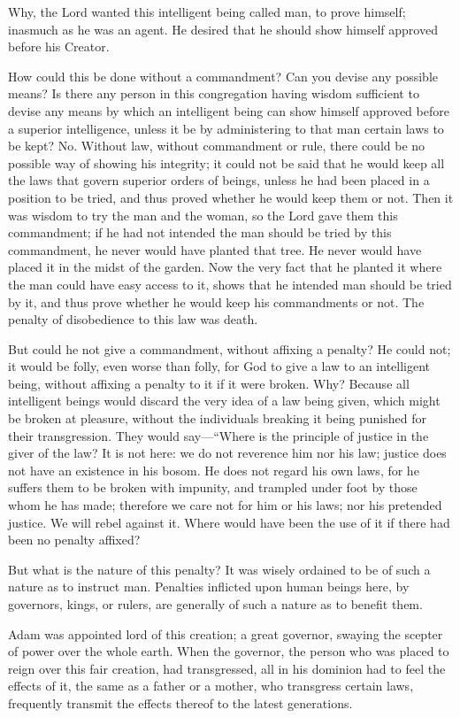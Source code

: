 Why, the Lord wanted this intelligent being called man, to prove himself; inasmuch as he
was an agent. He desired that he should show himself approved before his Creator.

How could this be done without a commandment? Can you devise any possible means? Is
there any person in this congregation having wisdom sufficient to devise any means by which
an intelligent being can show himself approved before a superior intelligence, unless it be by
administering to that man certain laws to be kept? No. Without law, without commandment
or rule, there could be no possible way of showing his integrity; it could not be said that he
would keep all the laws that govern superior orders of beings, unless he had been placed in a
position to be tried, and thus proved whether he would keep them or not. Then it was wisdom
to try the man and the woman, so the Lord gave them this commandment; if he had not
intended the man should be tried by this commandment, he never would have planted that
tree. He never would have placed it in the midst of the garden. Now the very fact that he
planted it where the man could have easy access to it, shows that he intended man should be
tried by it, and thus prove whether he would keep his commandments or not. The penalty of
disobedience to this law was death.

But could he not give a commandment, without affixing a penalty? He could not; it would be
folly, even worse than folly, for God to give a law to an intelligent being, without affixing a
penalty to it if it were broken. Why? Because all intelligent beings would discard the very
idea of a law being given, which might be broken at pleasure, without the individuals
breaking it being punished for their transgression. They would say—``Where is the principle
of justice in the giver of the law? It is not here: we do not reverence him nor his law; justice
does not have an existence in his bosom. He does not regard his own laws, for he suffers
them to be broken with impunity, and trampled under foot by those whom he has made;
therefore we care not for him or his laws; nor his pretended justice. We will rebel against it.
Where would have been the use of it if there had been no penalty affixed?

But what is the nature of this penalty? It was wisely ordained to be of such a nature as to
instruct man. Penalties inflicted upon human beings here, by governors, kings, or rulers, are
generally of such a nature as to benefit them.

Adam was appointed lord of this creation; a great governor, swaying the scepter of power
over the whole earth. When the governor, the person who was placed to reign over this fair
creation, had transgressed, all in his dominion had to feel the effects of it, the same as a
father or a mother, who transgress certain laws, frequently transmit the effects thereof to the
latest generations.

